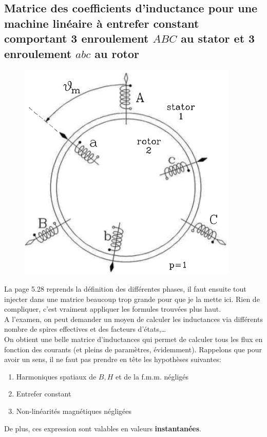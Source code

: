 	\subsection{Matrice des coefficients d'inductance pour une machine linéaire à 
	entrefer constant comportant 3 enroulement $ABC$ au stator et 3 enroulement 
	$abc$ au rotor}
	\begin{figure}
	\vspace{-8mm}
	\includegraphics[scale=0.3]{ch5/image15.png}
	\end{figure}
	La page 5.28 reprends la définition des différentes phases, il faut ensuite 
	tout injecter dans une matrice beaucoup trop grande pour que je la  mette ici. 
	Rien de compliquer, c'est vraiment appliquer les formules trouvées plus haut.\\
	
	A l'examen, on peut demander un moyen de calculer les inductances via différents 
	nombre de spires effectives et des facteurs d'états,\dots\\
	
	On obtient une belle matrice d'inductances qui permet de calculer tous les flux 
	en fonction des courants (et pleins de paramètres, évidemment). Rappelons que 
	pour avoir un sens, il ne faut pas prendre en tête les  hypothèses suivantes:
	\begin{enumerate}
	\item Harmoniques spatiaux de $B,H$ et de la f.m.m. négligés
	\item Entrefer constant
	\item Non-linéarités magnétiques négligées
	\end{enumerate}
	De plus, ces expression sont valables en valeurs \textbf{instantanées}.
	
